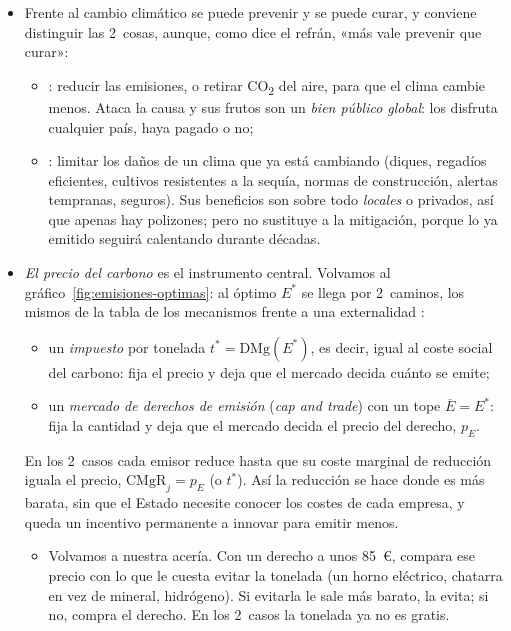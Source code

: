 \documentclass[11pt]{article}
\begin{document}
\begin{itemize}
\item Frente al cambio climático se puede prevenir y se puede curar, y conviene distinguir las 2~cosas, aunque, como dice el refrán, «más vale prevenir que curar»:
  \begin{itemize}
  \item {}: reducir las emisiones, o retirar CO\textsubscript{2} del aire, para que el clima cambie menos. Ataca la causa y sus frutos son un \emph{bien público global}: los disfruta cualquier país, haya pagado o no;
  \item {}: limitar los daños de un clima que ya está cambiando (diques, regadíos eficientes, cultivos resistentes a la sequía, normas de construcción, alertas tempranas, seguros). Sus beneficios son sobre todo \emph{locales} o privados, así que apenas hay polizones; pero no sustituye a la mitigación, porque lo ya emitido seguirá calentando durante décadas.
  \end{itemize}
\item \emph{El precio del carbono} es el instrumento central. Volvamos al gráfico~\ref{fig:emisiones-optimas}: al óptimo $E^*$ se llega por 2~caminos, los mismos de la tabla de los mecanismos frente a una externalidad :
  \begin{itemize}
  \item un \emph{impuesto} por tonelada $t^*=\mathrm{DMg}(E^*)$, es decir, igual al coste social del carbono: fija el precio y deja que el mercado decida cuánto se emite\nocite{Pigou1920Economics};
  \item un \emph{mercado de derechos de emisión} (\emph{cap and trade}) con un tope $\overline{E}=E^*$: fija la cantidad y deja que el mercado decida el precio del derecho, $p_E$\nocite{Dales1968Pollution,Montgomery1972Markets}.
  \end{itemize}
  En los 2~casos cada emisor reduce hasta que su coste marginal de reducción iguala el precio, $\mathrm{CMgR}_j=p_E$ (o $t^*$). Así la reducción se hace donde es más barata, sin que el Estado necesite conocer los costes de cada empresa, y queda un incentivo permanente a innovar para emitir menos.
  \begin{itemize}
  \item Volvamos a nuestra acería. Con un derecho a unos 85~€, compara ese precio con lo que le cuesta evitar la tonelada (un horno eléctrico, chatarra en vez de mineral, hidrógeno). Si evitarla le sale más barato, la evita; si no, compra el derecho. En los 2~casos la tonelada ya no es gratis.

\end{itemize}
\end{itemize}
\end{document}
